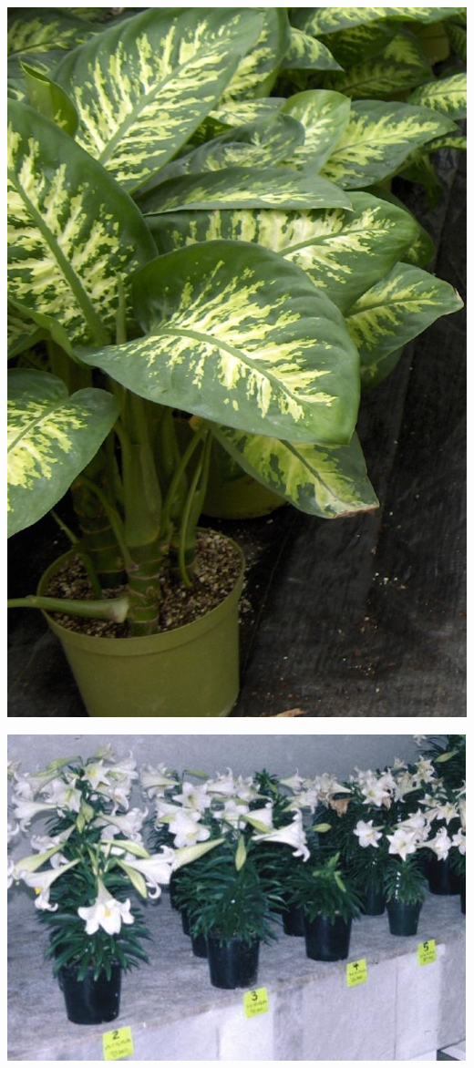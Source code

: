 \documentclass{article}
\begin{document}
\begin{center}
\includegraphics[height=0.9\textheight, angle=90]{../Dieffenbachia1.jpg}
\end{center}
\newpage

\begin{center}
\includegraphics[height=0.9\textheight, angle=90]{../EasterLily.jpg}
\end{center}
\newpage
\end{document}
